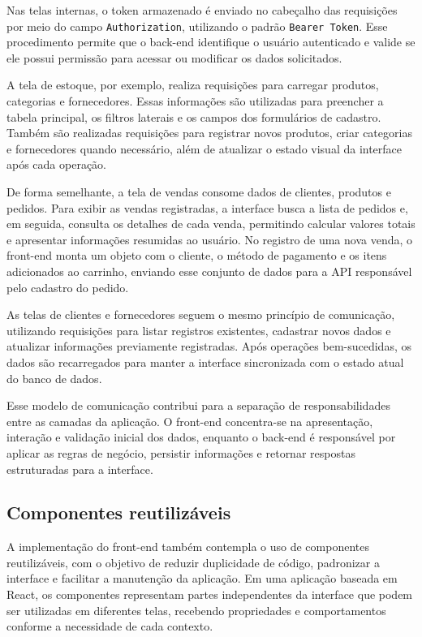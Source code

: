 Nas telas internas, o token armazenado é enviado no cabeçalho das requisições por meio do campo \texttt{Authorization}, utilizando o padrão \texttt{Bearer Token}. Esse procedimento permite que o back-end identifique o usuário autenticado e valide se ele possui permissão para acessar ou modificar os dados solicitados.

A tela de estoque, por exemplo, realiza requisições para carregar produtos, categorias e fornecedores. Essas informações são utilizadas para preencher a tabela principal, os filtros laterais e os campos dos formulários de cadastro. Também são realizadas requisições para registrar novos produtos, criar categorias e fornecedores quando necessário, além de atualizar o estado visual da interface após cada operação.

De forma semelhante, a tela de vendas consome dados de clientes, produtos e pedidos. Para exibir as vendas registradas, a interface busca a lista de pedidos e, em seguida, consulta os detalhes de cada venda, permitindo calcular valores totais e apresentar informações resumidas ao usuário. No registro de uma nova venda, o front-end monta um objeto com o cliente, o método de pagamento e os itens adicionados ao carrinho, enviando esse conjunto de dados para a API responsável pelo cadastro do pedido.

As telas de clientes e fornecedores seguem o mesmo princípio de comunicação, utilizando requisições para listar registros existentes, cadastrar novos dados e atualizar informações previamente registradas. Após operações bem-sucedidas, os dados são recarregados para manter a interface sincronizada com o estado atual do banco de dados.

Esse modelo de comunicação contribui para a separação de responsabilidades entre as camadas da aplicação. O front-end concentra-se na apresentação, interação e validação inicial dos dados, enquanto o back-end é responsável por aplicar as regras de negócio, persistir informações e retornar respostas estruturadas para a interface.

\subsection{Componentes reutilizáveis}

A implementação do front-end também contempla o uso de componentes reutilizáveis, com o objetivo de reduzir duplicidade de código, padronizar a interface e facilitar a manutenção da aplicação. Em uma aplicação baseada em React, os componentes representam partes independentes da interface que podem ser utilizadas em diferentes telas, recebendo propriedades e comportamentos conforme a necessidade de cada contexto.

